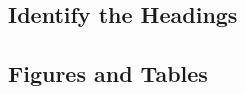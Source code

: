 \documentclass[conference]{IEEEtran}
\begin{document}
    \subsection{Identify the Headings}
%
%

    \subsection{Figures and Tables}
%
\end{document}
